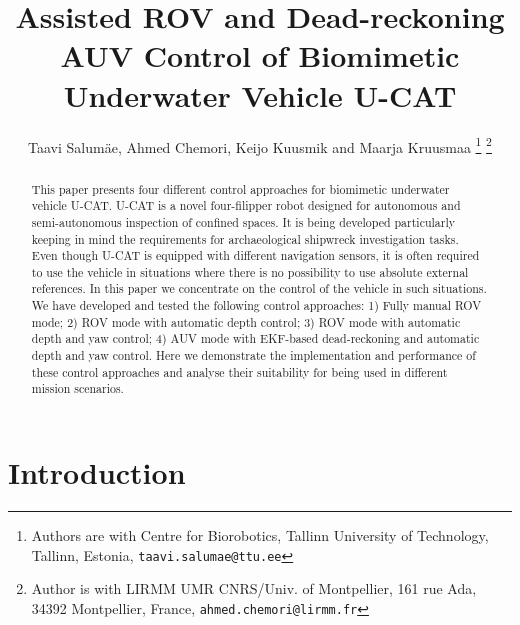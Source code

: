 \documentclass[conference]{IEEEtran}
\begin{document}
\title{Assisted ROV and Dead-reckoning AUV Control of Biomimetic Underwater Vehicle U-CAT}

\author{Taavi Salum\"{a}e, Ahmed Chemori, Keijo Kuusmik and Maarja Kruusmaa%
\thanks{Authors are with Centre for Biorobotics, Tallinn University of Technology, Tallinn, Estonia, {\tt\small taavi.salumae@ttu.ee}}%
\thanks{Author is with LIRMM UMR CNRS/Univ. of Montpellier, 161 rue Ada, 34392 Montpellier, France, {\tt\small ahmed.chemori@lirmm.fr}}}

\maketitle

\begin{abstract}
This paper presents four different control approaches for biomimetic underwater vehicle U-CAT.
U-CAT is a novel four-filipper robot designed for autonomous and semi-autonomous inspection of confined spaces.
It is being developed particularly keeping in mind the requirements for archaeological shipwreck investigation tasks.
Even though U-CAT is equipped with different navigation sensors, it is often required to use the vehicle in situations where there is no possibility to use absolute external references. 
In this paper we concentrate on the control of the vehicle in such situations.
We have developed and tested the following control approaches: 
1) Fully manual ROV mode; 
2) ROV mode with automatic depth control; 
3) ROV mode with automatic depth and yaw control; 
4) AUV mode with EKF-based dead-reckoning and automatic depth and yaw control. 
Here we demonstrate the implementation and performance of these control approaches and analyse their suitability for being used in different mission scenarios.  
\end{abstract}

\IEEEpeerreviewmaketitle

\section{Introduction}
\end{document}
